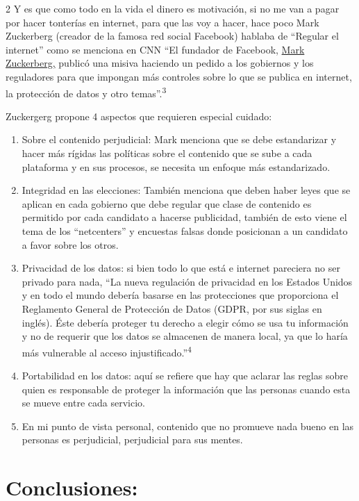 \documentclass[12pt,spanish,Letterpaper,openany]{book}
\begin{document}
\begin {multicols}{2}
Y es que como todo en la vida el dinero es motivación, si no me van a pagar por hacer tonterías en internet, para que las voy a hacer, hace poco Mark Zuckerberg (creador de la famosa red social Facebook) hablaba de ``Regular el internet'' como se menciona en CNN ``El fundador de Facebook, \href{https://cnnespanol.cnn.com/tag/mark-zuckerberg/}{{Mark Zuckerberg,}} publicó una misiva haciendo un pedido a los gobiernos y los reguladores para que impongan más controles sobre lo que se publica en internet, la protección de datos y otro temas''.\textsuperscript{3}

Zuckergerg propone 4 aspectos que requieren especial cuidado:

\begin{enumerate}
\def\labelenumi{\arabic{enumi}.}
\item
  Sobre el contenido perjudicial: Mark menciona que se debe estandarizar y hacer más rígidas las políticas sobre el contenido que se sube a cada plataforma y en sus procesos, se necesita un enfoque más estandarizado.
\item
  Integridad en las elecciones: También menciona que deben haber leyes que se aplican en cada gobierno que debe regular que clase de contenido es permitido por cada candidato a hacerse publicidad, también de esto viene el tema de los ``netcenters'' y encuestas falsas donde posicionan a un candidato a favor sobre los otros.
\item
  Privacidad de los datos: si bien todo lo que está e internet pareciera no ser privado para nada, ``La nueva regulación de privacidad en los Estados Unidos y en todo el mundo debería basarse en las protecciones que proporciona el Reglamento General de Protección de Datos (GDPR, por sus siglas en inglés). Éste debería proteger tu derecho a elegir cómo se usa tu información y no de requerir que los datos se almacenen de manera local, ya que lo haría más vulnerable al acceso injustificado.''\textsuperscript{4}
\item
  Portabilidad en los datos: aquí se refiere que hay que aclarar las reglas sobre quien es responsable de proteger la información que las personas cuando esta se mueve entre cada servicio.
\item
  En mi punto de vista personal, contenido que no promueve nada bueno en las personas es perjudicial, perjudicial para sus mentes.
\end{enumerate}

\hypertarget{conclusiones-13}{%
\section{Conclusiones:}\label{conclusiones-13}}


\end{multicols}
\end{document}
